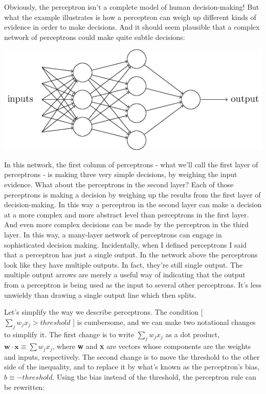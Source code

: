 \documentclass[a4paper,12pt]{report}%
\begin{document}
Obviously, the perceptron isn't a complete model of human decision-making! But what the example illustrates is how a perceptron can weigh up different kinds of evidence in order to make decisions. And it should seem plausible that a complex network of perceptrons could make quite subtle decisions:

\begin{center}
 \includegraphics[width=0.9\linewidth]{images/tikz1.png}
\end{center}

In this network, the first column of perceptrons - what we'll call the first layer of perceptrons - is making three very simple decisions, by weighing the input evidence. What about the perceptrons in the second layer? Each of those perceptrons is making a decision by weighing up the results from the first layer of decision-making. In this way a perceptron in the second layer can make a decision at a more complex and more abstract level than perceptrons in the first layer. And even more complex decisions can be made by the perceptron in the third layer. In this way, a many-layer network of perceptrons can engage in sophisticated decision making.
Incidentally, when I defined perceptrons I said that a perceptron has just a single output. In the network above the perceptrons look like they have multiple outputs. In fact, they're still single output. The multiple output arrows are merely a useful way of indicating that the output from a perceptron is being used as the input to several other perceptrons. It's less unwieldy than drawing a single output line which then splits.

Let's simplify the way we describe perceptrons. The condition [ $\sum_{j} w_{j}x_{j} > threshold$ ] is cumbersome, and we can make two notational changes to simplify it. The first change is to write $\sum_{j} w_{j}x_{j}$ as a dot product, $ \mathbf{w} \cdot \mathbf{x} \equiv \sum w_{j}x_{j}$, where \textbf{w} and \textbf{x} are vectors whose components are the weights and inputs, respectively. The second change is to move the threshold to the other side of the inequality, and to replace it by what's known as the perceptron's bias, $b \equiv  - threshold$. Using the bias instead of the threshold, the perceptron rule can be rewritten:
\end{document}
